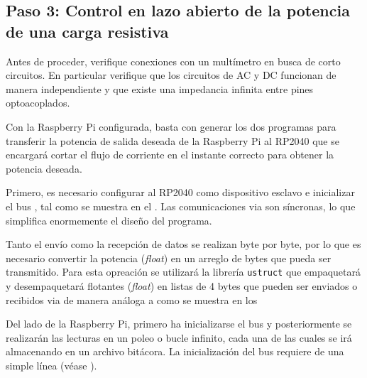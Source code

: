 %
%

\subsection{Paso 3: Control en lazo abierto de la potencia de una carga resistiva}%
\label{sec:step3}
Antes de proceder, verifique conexiones con un multímetro en busca de corto circuitos.
En particular verifique que los circuitos de AC y DC funcionan de manera independiente y que existe una impedancia infinita entre pines optoacoplados.

Con la Raspberry Pi configurada, basta con generar los dos programas para transferir la potencia de salida deseada de la Raspberry Pi al RP2040 que se encargará cortar el flujo de corriente en el instante correcto para obtener la potencia deseada.

Primero, es necesario configurar al RP2040 como dispositivo esclavo e inicializar el bus \IIC, tal como se muestra en el .
Las comunicaciones via \IIC son síncronas, lo que simplifica enormemente el diseño del programa.


Tanto el envío como la recepción de datos se realizan byte por byte, por lo que es necesario convertir la potencia (\emph{float}) en un arreglo de bytes que pueda ser transmitido.
Para esta opreación se utilizará la librería \texttt{ustruct} que empaquetará y desempaquetará flotantes (\emph{float}) en listas de 4 bytes que pueden ser enviados o recibidos via \IIC de manera análoga a como se muestra en los 


Del lado de la Raspberry Pi, primero ha inicializarse el bus \IIC y posteriormente se realizarán las lecturas en un poleo o bucle infinito, cada una de las cuales se irá almacenando en un archivo bitácora.
La inicialización del bus requiere de una simple línea (véase ).


